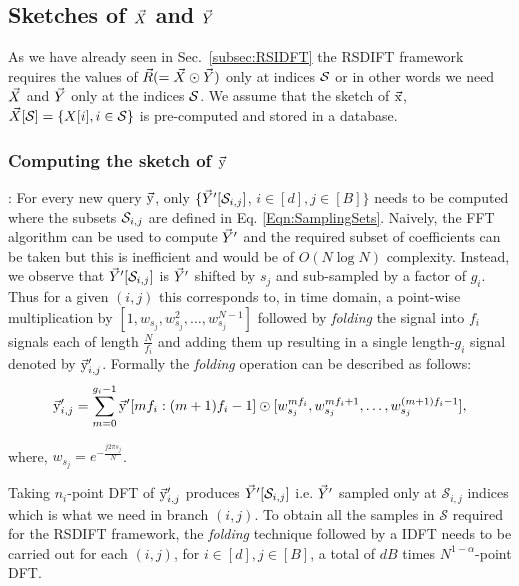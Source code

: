 \subsection{Sketches of $\vec{X}$ and $\vec{Y}$}
\label{subsec:skteches}		
 As we have already seen in Sec.~\ref{subsec:RSIDFT} the RSDIFT framework requires the values of $\vec{R}(=\vec{X}\odot \vec{Y})$ only at indices $\mathcal{S}$ or in other words we need $\vec{X}$ and $\vec{Y}$ only at the indices $\mathcal{S}$. We assume that the sketch of $\vec{\mathrm{x}}$, $ \vec{X}[\mathcal{S}]= \{X[i],i\in \mathcal{S}\}$ is pre-computed and stored in a database.

\subsubsection*{Computing the sketch of $\vec{\mathrm{y}}$}: For every new query $\vec{\mathrm{y}}$, only $\{\vec{Y}'[\mathcal{S}_{i,j}]$,  $i\in[d],j\in[B]\}$ needs to be computed where the subsets $\mathcal{S}_{i,j}$ are defined in Eq. \eqref{Eqn:SamplingSets}. Naively, the FFT algorithm can be used to compute $\vec{Y}'$ and the required subset of coefficients can be taken but this is inefficient and would be of $O(N \log N)$ complexity. Instead, we observe that $\vec{Y}'[\mathcal{S}_{i,j}]$ is $\vec{Y}'$ shifted by $s_j$ and sub-sampled by a factor of $g_i$. Thus for a given $(i,j)$ this corresponds to, in time domain, a point-wise multiplication by $[1,w_{s_j},w_{s_j}^2,\ldots,w_{s_j}^{N-1}]$ followed by \textit{folding} the signal into $f_i$ signals each of length $\frac{N}{f_i}$ and adding them up resulting in a single length-$g_i$ signal denoted by $\vec{\mathrm{y}}'_{i,j}$. Formally the \textit{folding} operation can be described as follows:
	  \begin{equation}
	  	\vec{\mathrm{y}}'_{i,j} = \sum \limits_{m = 0}^{g_i-1} \vec{\mathrm{y}}'[mf_i:(m+1)f_i-1] \odot [w_{s_j}^{mf_i},w_{s_j}^{mf_i+1},\ldots, w_{s_j}^{(m+1)f_i-1}],
	  \end{equation}
	  
	  where, $w_{s_j}=e^{-\frac{j2\pi s_j}{N}}$.
	  
 Taking $n_i$-point DFT of $\vec{\mathrm{y}}'_{i,j}$ produces $\vec{Y}'[\mathcal{S}_{i,j}]$ i.e. $\vec{Y}'$ sampled only at $\mathcal{S}_{i,j}$ indices which is what we need in branch $(i,j)$. To obtain all the samples in $\mathcal{S}$ required for the RSDIFT framework, the \textit{folding} technique followed by a IDFT needs to be carried out for each $(i,j)$, for $i\in[d],j\in[B]$, a total of $dB$ times $N^{1-\alpha}$-point DFT. 
 

